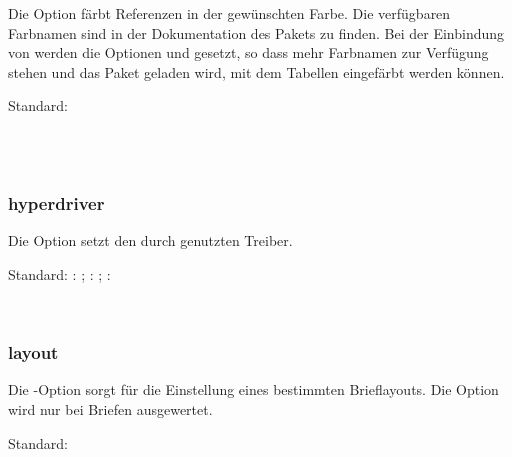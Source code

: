 Die Option  färbt Referenzen in der gewünschten Farbe.
Die verfügbaren Farbnamen sind in der Dokumentation des Pakets  zu finden.
Bei der Einbindung von  werden die Optionen  und  gesetzt, so dass mehr Farbnamen zur Verfügung stehen und das Paket  geladen wird, mit dem Tabellen eingefärbt werden können.

Standard: 

\begin{nutzung}
		\>\\
	\beispiel
		\>\\
		\>
\end{nutzung}

\subsubsection{hyperdriver}

Die Option  setzt den durch  genutzten Treiber.

Standard: : ; : ; : 

\begin{nutzung}
		\>\\
	\beispiel
		\>
\end{nutzung}


\subsubsection{layout}

Die -Option sorgt für die Einstellung eines bestimmten Brieflayouts.
Die Option wird nur bei Briefen ausgewertet.

Standard: 

\begin{nutzung}
		\>\\
	\beispiel
		\>\\
		\>
\end{nutzung}

